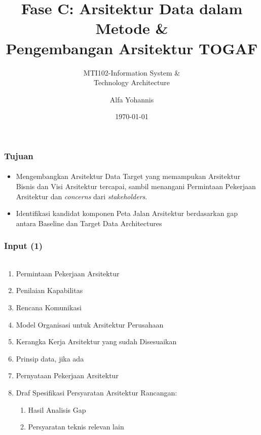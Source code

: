 \documentclass[aspectratio=169, table]{beamer}
\subtitle{MTI102-Information System \&\\Technology Architecture}
\title{Fase C: Arsitektur Data dalam Metode \&\\ Pengembangan Arsitektur TOGAF}
\author{Alfa Yohannis}
\date{\today}
\begin{document}
	
	\frame{\titlepage}
	
	\begin{frame}
		\frametitle{Tujuan}
		\framesubtitle{\hspace{1cm}}
		\begin{itemize}
			\item Mengembangkan Arsitektur Data Target yang memampukan Arsitektur Bisnis dan Visi Arsitektur tercapai, sambil menangani Permintaan Pekerjaan Arsitektur dan \textit{concerns} dari \textit{stakeholders}.
			\item Identifikasi kandidat komponen Peta Jalan Arsitektur berdasarkan gap antara Baseline dan Target Data Architectures
		\end{itemize}
	\end{frame}
	
	\begin{frame}
		\frametitle{Input (1)}
		\framesubtitle{\hspace{1cm}}
		\begin{columns}
			\begin{column}{1\textwidth}
				\begin{center}
					\begin{enumerate}
						\item Permintaan Pekerjaan Arsitektur
						\item Penilaian Kapabilitas
						\item Rencana Komunikasi
						\item Model Organisasi untuk Arsitektur Perusahaan
						\item Kerangka Kerja Arsitektur yang sudah Disesuaikan
						\item Prinsip data, jika ada
						\item Pernyataan Pekerjaan Arsitektur
						\item Draf Spesifikasi Persyaratan Arsitektur Rancangan:
						\begin{enumerate}
							\item Hasil Analisis Gap
							\item Persyaratan teknis relevan lain
						\end{enumerate}
					\end{enumerate}
				\end{center}
			\end{column}
			\begin{column}{0.5\textwidth}
				\begin{center}
					\begin{enumerate}
						\setcounter{enumi}{8}
						
					\end{enumerate}
				\end{center}
			\end{column}
		\end{columns}
	\end{frame}
	
\end{document}
